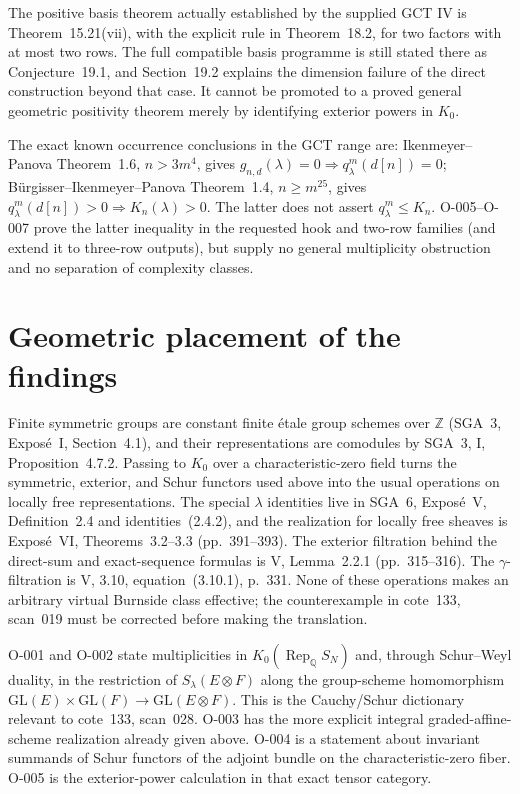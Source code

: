 The positive basis theorem actually established by the supplied GCT IV
is Theorem~15.21(vii), with the explicit rule in Theorem~18.2, for
two factors with at most two rows. The full compatible basis programme
is still stated there as Conjecture~19.1, and Section~19.2 explains
the dimension failure of the direct construction beyond that case.
It cannot be promoted to a proved general geometric positivity theorem
merely by identifying exterior powers in $K_0$.

The exact known occurrence conclusions in the GCT range are:
Ikenmeyer--Panova Theorem~1.6, $n>3m^4$, gives
$g_{n,d}(\lambda)=0\Rightarrow q^m_\lambda(d[n])=0$;
B\"urgisser--Ikenmeyer--Panova Theorem~1.4, $n\geq m^{25}$, gives
$q^m_\lambda(d[n])>0\Rightarrow K_n(\lambda)>0$.
The latter does not assert $q^m_\lambda\leq K_n$.
O-005--O-007 prove the latter inequality in the requested hook and
two-row families (and extend it to three-row outputs), but supply
no general multiplicity obstruction and no separation of complexity
classes.

\section{Geometric placement of the findings}

Finite symmetric groups are constant finite \'etale group schemes
over $\mathbb Z$ (SGA~3, Expos\'e~I, Section~4.1), and their
representations are comodules by SGA~3, I, Proposition~4.7.2.
Passing to $K_0$ over a characteristic-zero field turns the symmetric,
exterior, and Schur functors used above into the usual operations on
locally free representations. The special $\lambda$ identities live
in SGA~6, Expos\'e~V, Definition~2.4 and identities~(2.4.2), and
the realization for locally free sheaves is Expos\'e~VI,
Theorems~3.2--3.3 (pp.~391--393). The exterior filtration behind the
direct-sum and exact-sequence formulas is V, Lemma~2.2.1
(pp.~315--316). The $\gamma$-filtration is V, 3.10,
equation~(3.10.1), p.~331. None of these operations makes an arbitrary
virtual Burnside class effective; the counterexample in cote~133,
scan~019 must be corrected before making the translation.

O-001 and O-002 state multiplicities in
$K_0(\operatorname{Rep}_{\mathbb Q}S_N)$ and, through Schur--Weyl
duality, in the restriction of $S_\lambda(E\otimes F)$ along the
group-scheme homomorphism
$\mathrm{GL}(E)\times\mathrm{GL}(F)\to\mathrm{GL}(E\otimes F)$.
This is the Cauchy/Schur dictionary relevant to cote~133, scan~028.
O-003 has the more explicit integral graded-affine-scheme realization
already given above. O-004 is a statement about invariant summands
of Schur functors of the adjoint bundle on the characteristic-zero
fiber. O-005 is the exterior-power calculation in that exact tensor
category.

